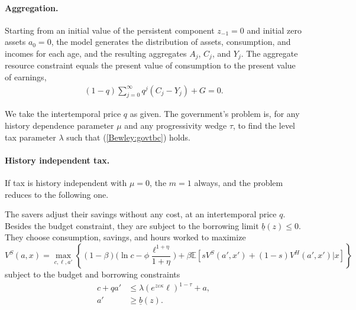 
 
 
\paragraph{Aggregation.} 


Starting from an initial value of the persistent component $z_{-1}=0$ and initial zero assets $a_0=0$, the model generates the distribution of assets, consumption, and incomes for each age, and the resulting aggregates $A_j$, $C_j$, and $Y_j$. The aggregate resource constraint equals the present value of consumption to the present value of earnings, 
\begin{align}
(1-q)\sum_{j=0}^{\infty} q^{j}(C_j - Y_j) + G = 0. \label{Bewley:govtbc}
\end{align}

We take the intertemporal price $q$ as given. The government's problem is, for any history dependence parameter $\mu$ and any progressivity wedge $\tau$, to find the level tax parameter $\lambda$ such that (\ref{Bewley:govtbc}) holds. 

\paragraph{History independent tax.} If tax is history independent with $\mu=0$, the $m=1$ always, and the problem reduces to the following one.

The savers adjust their savings without any cost, at an intertemporal price $q$. Besides the budget constraint, they are subject to the borrowing limit $\underline{b}(z)\leq 0$. They choose consumption, savings, and hours worked to maximize
\[
V^S(a,x) = \max_{c,\ell,a'} \left\{ (1-\beta) \big(\ln c- \phi \frac { \ell^{1+\eta}}{1+\eta}  \big) +\beta  \mathbb{E} \left[ s V^S(a',x') +(1-s)V^H(a',x') | x \right] \right\}
\]
subject to the budget and borrowing constraints
\begin{align}
c +q a' &\leq \lambda \left( e^{z\varepsilon \kappa} \ell  \right) ^{1-\tau} +a, \label{Ahi:bc} \\
a' &\geq \underline{b}(z).\label{Ahi:boc}
\end{align}

